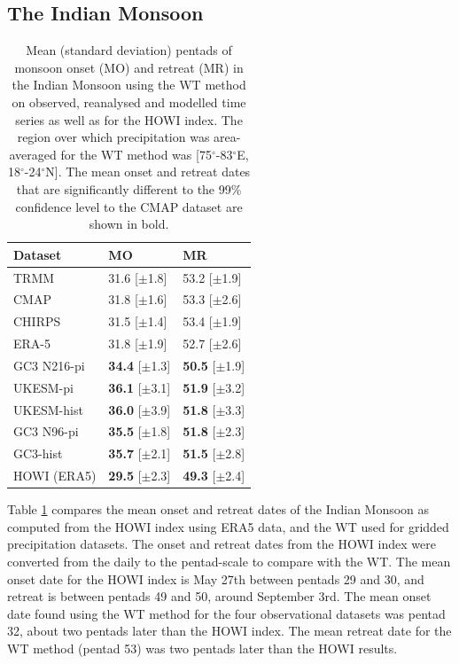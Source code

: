 \subsection{The Indian Monsoon}
\begin{table}[b!]
\caption{Mean (standard deviation) pentads of monsoon onset (MO) and retreat (MR) in the Indian Monsoon using the WT method on observed, reanalysed and modelled time series as well as for the HOWI index. The region over which precipitation was area-averaged for the WT method was [75$^\circ$-83$^\circ$E, 18$^\circ$-24$^\circ$N]. The mean onset and retreat dates that are significantly different to the 99\% confidence level to the CMAP dataset are shown in bold.  }
\label{tab:3a}       %
\begin{tabular}{p{4cm}p{3.5cm}p{3.5cm}}
\hline\centering{\smallskip}
Dataset & MO 	& MR 	\\ \hline
TRMM & 31.6 [$\pm$1.8] & 53.2 [$\pm$1.9]   \\
CMAP & 31.8 [$\pm$1.6] & 53.3 [$\pm$2.6]   \\
CHIRPS & 31.5 [$\pm$1.4] & 53.4 [$\pm$1.9]    \\
ERA-5 & 31.8 [$\pm$1.9] & 52.7 [$\pm$2.6]    \\
GC3 N216-pi  & {\bf34.4} [$\pm$1.3] & {\bf 50.5} [$\pm$1.9] \\
UKESM-pi & {\bf36.1} [$\pm$3.1] & {\bf 51.9} [$\pm$3.2]   \\
UKESM-hist & {\bf36.0} [$\pm$3.9] & {\bf51.8} [$\pm$3.3]   \\
GC3 N96-pi & {\bf35.5} [$\pm$1.8] & {\bf51.8} [$\pm$2.3]  \\
GC3-hist & {\bf35.7} [$\pm$2.1] & {\bf51.5} [$\pm$2.8]  \\
HOWI (ERA5) & {\bf29.5} [$\pm$2.3] & {\bf49.3} [$\pm$2.4]
\end{tabular}
\end{table}

Table \ref{tab:3a} compares the mean onset and retreat dates of the Indian Monsoon as computed from the HOWI index using ERA5 data, and the WT used for gridded precipitation datasets.
The onset and retreat dates from the HOWI index were converted from the daily to the pentad-scale to compare with the WT. The mean onset date for the HOWI index is May 27th between pentads 29 and 30, and retreat is between pentads 49 and 50, around September 3rd. The mean onset date found using the WT method for the four observational datasets was pentad 32, about two pentads later than the HOWI index. The mean retreat date for the WT method (pentad 53) was two pentads later than the HOWI results.


